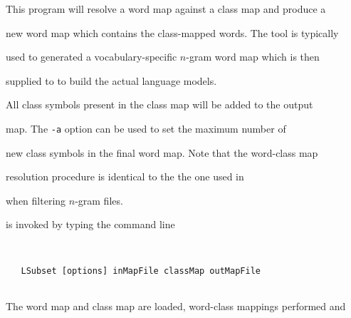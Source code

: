 %




%




%





\newpage














This program will resolve a word map against a class map and produce a


new word map which contains the class-mapped words. The tool is typically


used to generated a vocabulary-specific $n$-gram word map which is then 


supplied to  to build the actual language models.





All class symbols present in the class map will be added to the output


map. The \texttt{-a} option can be used to set the maximum number of


new class symbols in the final word map. Note that the word-class map


resolution procedure is identical to the the one used in 


when filtering $n$-gram files.










 is invoked by typing the command line


\begin{verbatim}


   LSubset [options] inMapFile classMap outMapFile


\end{verbatim}


The word map and class map are loaded, word-class mappings performed and 


